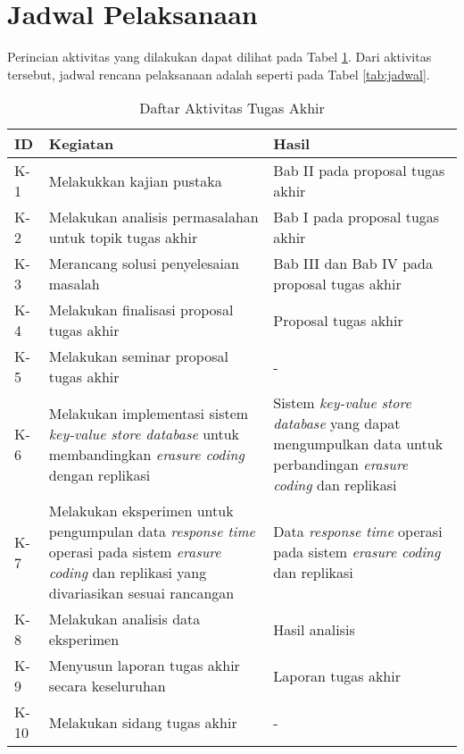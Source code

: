 \section{Jadwal Pelaksanaan}
\label{sec:jadwal-pelaksanaan}
Perincian aktivitas yang dilakukan dapat dilihat pada  Tabel \ref{tab:rincian-aktivitas}. Dari aktivitas tersebut, jadwal rencana pelaksanaan adalah seperti pada Tabel \ref{tab:jadwal}.

\begin{table}[h!]
\centering
\caption{Daftar Aktivitas Tugas Akhir}
\begin{tabular}{|p{1cm}|p{6cm}|p{6cm}|}
\hline
ID & Kegiatan & Hasil \\ \hline
K-1  & Melakukkan kajian pustaka & Bab II pada proposal tugas akhir \\ \hline
K-2  & Melakukan analisis permasalahan untuk topik tugas akhir & Bab I pada proposal tugas akhir \\ \hline
K-3  & Merancang solusi penyelesaian masalah & Bab III dan Bab IV pada proposal tugas akhir \\ \hline
K-4  & Melakukan finalisasi proposal tugas akhir & Proposal tugas akhir \\ \hline
K-5  & Melakukan seminar proposal tugas akhir & - \\ \hline
K-6  & Melakukan implementasi sistem \textit{key-value store database} untuk membandingkan \textit{erasure coding} dengan replikasi \textit{} & Sistem \textit{key-value store database} yang dapat mengumpulkan data untuk perbandingan \textit{erasure coding} dan replikasi \\ \hline
K-7  & Melakukan eksperimen untuk pengumpulan data \textit{response time} operasi pada sistem \textit{erasure coding} dan replikasi yang divariasikan sesuai rancangan & Data \textit{response time} operasi pada sistem \textit{erasure coding} dan replikasi \\ \hline
K-8  & Melakukan analisis data eksperimen & Hasil analisis \\ \hline
K-9  & Menyusun laporan tugas akhir secara keseluruhan & Laporan tugas akhir \\ \hline
K-10  & Melakukan sidang tugas akhir & - \\ \hline
\end{tabular}
\label{tab:rincian-aktivitas}
\end{table}

